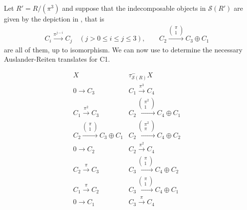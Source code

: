 \documentclass[a4paper]{amsart}
\numberwithin{equation}{section} \theoremstyle{plain}
\numberwithin{thm}{section}
\begin{document}
Let $R'=R/(\pi^3)$ and suppose that the indecomposable objects in $\mathcal{S}(R')$ are given by the depiction in , that is
\begin{align*}
    C_i\xrightarrow{\pi^{j-i}} C_j \quad (j>0\leq i \leq j\leq 3), \qquad C_2\xrightarrow{\left(\begin{smallmatrix}
        \pi\\1
    \end{smallmatrix}\right)}C_3\oplus C_1
\end{align*}
are all of them, up to isomorphism. We can now use  to determine the necessary Auslander-Reiten translates for C1. 

\begin{equation*}
\begin{array}{c|c}
X & \tau^-_{\mathcal{S}(R)}X \\ \hline
0 \to C_3 & C_1\xrightarrow{\pi^3}C_4\\
C_1 \xrightarrow{\pi^2} C_3 & C_2\xrightarrow{\left(\begin{smallmatrix}
    \pi^2 \\1
\end{smallmatrix}\right)}C_4\oplus C_1\\
C_2 \xrightarrow{\left(\begin{smallmatrix}
    \pi\\
    1
\end{smallmatrix}\right)} C_3 \oplus C_1     & C_2\xrightarrow{\left(\begin{smallmatrix}
    \pi^2 \\ \pi
\end{smallmatrix}\right)}C_4\oplus C_2\\

0 \to C_2 & C_2\xrightarrow{\pi^2}C_4\\
C_2 \xrightarrow{\pi} C_3 & C_3\xrightarrow{\left(\begin{smallmatrix}
    \pi \\1
\end{smallmatrix}\right)}C_4\oplus C_2\\
C_1 \xrightarrow{\pi} C_2 & C_3\xrightarrow{\left(\begin{smallmatrix}
    \pi \\1
\end{smallmatrix}\right)}C_4\oplus C_1\\
0 \to C_1 & C_3\xrightarrow{\pi}C_4
\end{array}
\end{equation*}
\end{document}
